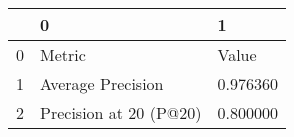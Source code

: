 \begin{tabular}{lll}
\toprule
 & 0 & 1 \\
\midrule
0 & Metric & Value \\
1 & Average Precision & 0.976360 \\
2 & Precision at 20 (P@20) & 0.800000 \\
\bottomrule
\end{tabular}
